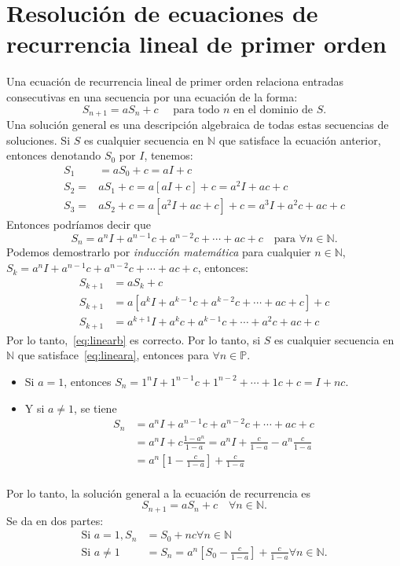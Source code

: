 \section{Resolución de ecuaciones de recurrencia lineal de primer orden}

Una ecuación de recurrencia lineal de primer orden relaciona entradas consecutivas en una secuencia por una ecuación de la forma:
\begin{equation}\label{eq:lineara}
S_{n+1}=a S_{n}+c\quad\text{ para todo }n\text{ en el dominio de } S.
\end{equation}
Una solución general es una descripción algebraica de todas estas secuencias de soluciones. Si $S$ es cualquier secuencia en $\mathds{N}$ que satisface la ecuación anterior, entonces denotando $S_{0}$ por $I$, tenemos:
\begin{align*}
S_1&=aS_0+c=aI+c \\
S_2=&aS_1+c=a[aI+c]+c=a^2I+ac+c \\
S_3=&aS_2+c=a[a^2I+ac+c]+c=a^3I+a^2c+ac+c
\end{align*}
Entonces podríamos decir que
\begin{equation}\label{eq:linearb}
S_n = a^nI+a^{n-1}c+a^{n-2}c +\cdots+ac+c\quad\text{para }\forall n\in\mathds{N}.
\end{equation}
Podemos demostrarlo por \emph{inducción matemática} para cualquier $n\in\mathds{N}$, $S_k=a^nI+a^{n-1}c+a^{n-2}c+\cdots+ac+c$, entonces:
\begin{align*}
S_{k+1}&=aS_{k} + c  \\
S_{k+1}&=a\left[a^kI+a^{k-1}c+a^{k-2}c+\cdots+ac+c\right] + c\\
S_{k+1}&=a^{k+1}I+a^k c+a^{k-1}c+\cdots+a^2c+ac+c
\end{align*}
Por lo tanto,~\eqref{eq:linearb} es correcto. Por lo tanto, si $S$ es cualquier secuencia en $\mathds{N}$ que satisface~\eqref{eq:lineara}, entonces para $\forall n\in \mathds{P}$.
\begin{itemize}
	\item Si $a=1$, entonces $S_n=1^nI+1^{n-1}c+1^{n-2}+\cdots+1c+c=I+nc$.
	\item Y si $a\neq1$, se tiene
	\begin{align*}
	S_n&=a^{n}I+a^{n-1}c+a^{n-2}c+\cdots+ac+c\\
	&=a^{n}I+c\frac{1-a^n}{1-a}=a^nI+\frac{c}{1-a}-a^n\frac{c}{1-a}\\
	&=a^{n}\left[1-\frac{c}{1-a}\right]+\frac{c}{1-a}\\
	\end{align*}
\end{itemize}
Por lo tanto, la solución general a la ecuación de recurrencia es \[ S_{n+1} = aS_n+c\quad\forall n\in\mathds{N}. \] Se da en dos partes:
\begin{align*}
\text{Si }a=1, S_n&= S_0+ nc\forall n\in\mathds{N}\\
\text{Si }a\neq1&=S_n= a^{n}\left[S_0-\frac{c}{1-a}\right]+\frac{c}{1-a}\forall n\in\mathds{N}.
\end{align*}

